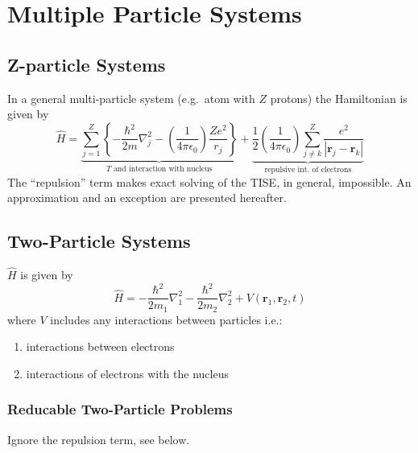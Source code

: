 \section{Multiple Particle Systems}
\subsection{Z-particle Systems}
In a general multi-particle system (e.g.\ atom with $Z$ protons) the Hamiltonian is given by
{\small     %
\begin{equation*}
    \widehat{H}=\underbrace{\sum_{j=1}^{Z}\left\{-\frac{\hbar^{2}}{2m}\nabla_{j}^{2}-\left(\frac{1}{4\pi \epsilon_{0}}\right)\frac{Ze^{2}}{r_{j}}\right\}}_{T\text{ and interaction with nucleus}} + \underbrace{\frac{1}{2}\left(\frac{1}{4\pi \epsilon_{0}}\right)\sum_{j\neq k}^{Z}\frac{e^{2}}{\left|\mathbf{r}_{j}-\mathbf{r}_{k}\right|}}_{\text{repulsive int.\ of electrons}}
\end{equation*}
}
The ``repulsion'' term makes exact solving of the TISE, in general, impossible. An approximation and an exception are presented hereafter.

\subsection{Two-Particle Systems}
$\widehat{H}$ is given by
\begin{equation*}
    \widehat{H}=-\frac{\hbar^{2}}{2m_{1}}\nabla_{1}^{2}-\frac{\hbar^{2}}{2m_{2}}\nabla_{2}^{2}+V(\mathbf{r}_{1},\mathbf{r}_{2},t)
\end{equation*}
where $V$ includes any interactions between particles i.e.:
\begin{enumerate}
    \item interactions between  electrons
    \item interactions of electrons with the nucleus
\end{enumerate}

\subsubsection{Reducable Two-Particle Problems}
\newpar{}

Ignore the repulsion term, see below.

\newpar{}

